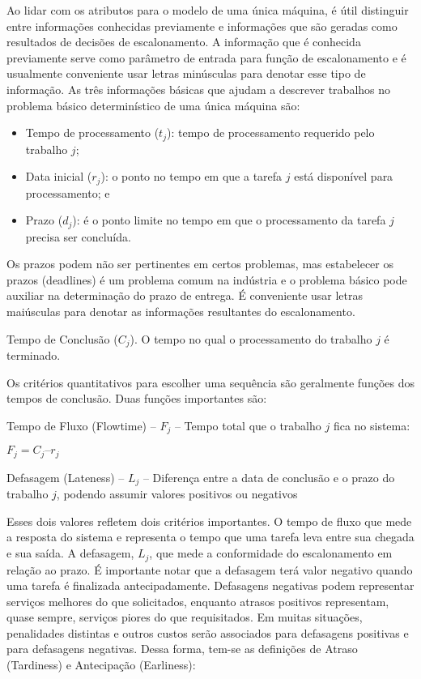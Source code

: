 Ao lidar com os atributos para o modelo de uma única máquina, é  útil distinguir entre informações conhecidas previamente e informações que são geradas como resultados de decisões de escalonamento. A informação que é conhecida previamente serve como parâmetro de entrada para função de escalonamento e é usualmente conveniente usar letras minúsculas para denotar esse tipo de informação. As três informações básicas que ajudam a descrever  trabalhos no problema básico determinístico de uma única máquina são: 

\begin{itemize}
\item Tempo de processamento ($t_j$): tempo de processamento requerido pelo trabalho $j$; 
\item Data inicial ($r_j$): o ponto no tempo em que a tarefa $j$ está disponível para processamento; e 
\item Prazo ($d_j$): é o ponto limite no tempo em que o processamento da tarefa $j$ precisa ser concluída. 
\end{itemize} 

Os prazos podem não ser pertinentes em certos problemas, mas estabelecer os prazos (deadlines) é um problema comum na indústria e o problema básico pode auxiliar na determinação do prazo de entrega. É conveniente usar letras maiúsculas para denotar as informações resultantes do escalonamento. 

Tempo de Conclusão ($C_j$). O tempo no qual o processamento do trabalho $j$ é terminado. 

Os critérios quantitativos para escolher uma sequência são geralmente funções dos tempos de conclusão. Duas funções importantes são: 

Tempo de Fluxo (Flowtime) – $F_j$ – Tempo total que o trabalho $j$ fica no sistema: 

$F_j = C_j – r_j$
 
Defasagem (Lateness) – $L_j$ – Diferença entre a data de conclusão e o prazo do trabalho $j$, podendo assumir valores positivos ou negativos

Esses dois valores refletem dois critérios importantes. O tempo de fluxo que mede a resposta do sistema  e representa o tempo que uma tarefa leva entre sua chegada e sua saída. A defasagem, $L_j$, que mede a conformidade do escalonamento em relação ao prazo. É importante notar que a defasagem terá valor negativo quando uma tarefa é finalizada antecipadamente. Defasagens negativas podem representar serviços melhores do que solicitados, enquanto atrasos positivos representam, quase sempre, serviços piores do que requisitados. Em muitas situações, penalidades distintas e outros custos serão associados para defasagens positivas e para defasagens negativas. Dessa forma, tem-se as definições de Atraso (Tardiness) e Antecipação (Earliness): 

